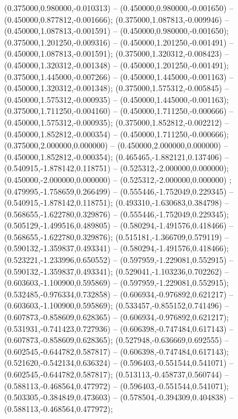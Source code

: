  (0.375000,0.980000,-0.010313) -- (0.450000,0.980000,-0.001650) -- (0.450000,0.877812,-0.001666);
 (0.375000,1.087813,-0.009946) -- (0.450000,1.087813,-0.001591) -- (0.450000,0.980000,-0.001650);
 (0.375000,1.201250,-0.009316) -- (0.450000,1.201250,-0.001491) -- (0.450000,1.087813,-0.001591);
 (0.375000,1.320312,-0.008423) -- (0.450000,1.320312,-0.001348) -- (0.450000,1.201250,-0.001491);
 (0.375000,1.445000,-0.007266) -- (0.450000,1.445000,-0.001163) -- (0.450000,1.320312,-0.001348);
 (0.375000,1.575312,-0.005845) -- (0.450000,1.575312,-0.000935) -- (0.450000,1.445000,-0.001163);
 (0.375000,1.711250,-0.004160) -- (0.450000,1.711250,-0.000666) -- (0.450000,1.575312,-0.000935);
 (0.375000,1.852812,-0.002212) -- (0.450000,1.852812,-0.000354) -- (0.450000,1.711250,-0.000666);
 (0.375000,2.000000,0.000000) -- (0.450000,2.000000,0.000000) -- (0.450000,1.852812,-0.000354);
 (0.465465,-1.882121,0.137406) -- (0.540915,-1.878142,0.118751) -- (0.525312,-2.000000,0.000000);
 (0.450000,-2.000000,0.000000) -- (0.525312,-2.000000,0.000000) ;
 (0.479995,-1.758659,0.266499) -- (0.555446,-1.752049,0.229345) -- (0.540915,-1.878142,0.118751);
 (0.493310,-1.630683,0.384798) -- (0.568655,-1.622780,0.329876) -- (0.555446,-1.752049,0.229345);
 (0.505129,-1.499516,0.489805) -- (0.580294,-1.491576,0.418466) -- (0.568655,-1.622780,0.329876);
 (0.515181,-1.366709,0.579119) -- (0.590132,-1.359837,0.493341) -- (0.580294,-1.491576,0.418466);
 (0.523221,-1.233996,0.650552) -- (0.597959,-1.229081,0.552915) -- (0.590132,-1.359837,0.493341);
 (0.529041,-1.103236,0.702262) -- (0.603603,-1.100900,0.595869) -- (0.597959,-1.229081,0.552915);
 (0.532485,-0.976334,0.732858) -- (0.606934,-0.976892,0.621217) -- (0.603603,-1.100900,0.595869);
 (0.533457,-0.855152,0.741496) -- (0.607873,-0.858609,0.628365) -- (0.606934,-0.976892,0.621217);
 (0.531931,-0.741423,0.727936) -- (0.606398,-0.747484,0.617143) -- (0.607873,-0.858609,0.628365);
 (0.527948,-0.636669,0.692555) -- (0.602545,-0.644782,0.587817) -- (0.606398,-0.747484,0.617143);
 (0.521620,-0.542134,0.636324) -- (0.596403,-0.551544,0.541071) -- (0.602545,-0.644782,0.587817);
 (0.513113,-0.458737,0.560744) -- (0.588113,-0.468564,0.477972) -- (0.596403,-0.551544,0.541071);
 (0.503305,-0.384849,0.473603) -- (0.578504,-0.394309,0.404838) -- (0.588113,-0.468564,0.477972);
